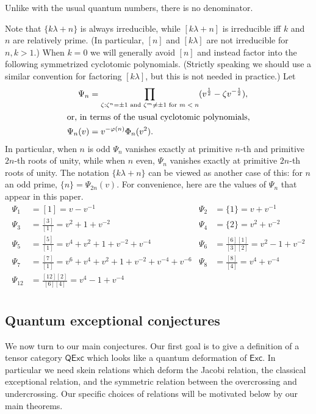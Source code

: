 \documentclass[12pt]{amsart}
\begin{document}
\begin{warning}
Unlike with the usual quantum numbers, there is no denominator.
\end{warning}

Note that $\{k\lambda + n\}$ is always irreducible, while $[k\lambda +
n]$ is irreducible iff $k$ and~$n$ are relatively prime. (In
particular, $[n]$ and $[k\lambda]$ are not irreducible for $n,k>1$.)
When
$k=0$ we will generally avoid $[n]$ and instead factor into the following
symmetrized cyclotomic polynomials.  (Strictly speaking we should use
a similar convention for factoring $[k \lambda]$, but this is not needed
in practice.)  Let
\begin{align*}
  \Psi_n &= \prod_{\zeta: \zeta^{n} = \pm 1 \text{ and } \zeta^m \neq \pm 1 \text{ for $m < n$}}
  (v^{\frac{1}{2}}-\zeta v^{-\frac{1}{2}}),\\
  \intertext{or, in terms of the usual cyclotomic polynomials,}
  \Psi_n(v) &= v^{-\varphi(n)} \Phi_{n}(v^2).
\end{align*}
In particular, when $n$ is odd $\Psi_n$ vanishes exactly at primitive
$n$-th and primitive $2n$-th roots of unity, while when $n$ even,
$\Psi_n$ vanishes exactly at primitive $2n$-th roots of unity.
The notation $\{k\lambda + n\}$ can be viewed as another case of this:
for $n$ an odd prime,
$\{n\} = \Psi_{2n}(v)$. For convenience, here are the values of $\Psi_n$ that
appear in this paper.
\begin{align*}
  \Psi_1 & = [1] = v - v^{-1} &
  \Psi_2 & = \{1\} = v + v^{-1}\\
  \Psi_3 & = \frac{[3]}{[1]} = v^2 + 1 + v^{-2}&
  \Psi_4 & = \{2\} = v^2 + v^{-2}\\
  \Psi_5 & = \frac{[5]}{[1]} = v^4 + v^2 + 1 + v^{-2} + v^{-4}&
  \Psi_6 & = \frac{[6][1]}{[3][2]} = v^2 - 1 + v^{-2}\\
  \Psi_7 & = \frac{[7]}{[1]} = v^6 + v^4 + v^2 + 1 + v^{-2} + v^{-4} + v^{-6} &
  \Psi_8 & = \frac{[8]}{[4]} = v^4 + v^{-4} \\
  \Psi_{12} & = \frac{[12][2]}{[6][4]} = v^4 - 1 + v^{-4} \\
\end{align*}
\subsection{Quantum exceptional conjectures}
\label{sec:intro-quantum}
We now turn to our main conjectures.  Our first goal is to give a definition
of a tensor category $\mathsf{QExc}$ which looks like a quantum deformation of
$\mathsf{Exc}$. In particular we need skein relations which deform the Jacobi
relation, the classical exceptional relation, and the symmetric relation
between the overcrossing and undercrossing.  Our specific choices of relations
will be motivated below by our main theorems.
\end{document}
